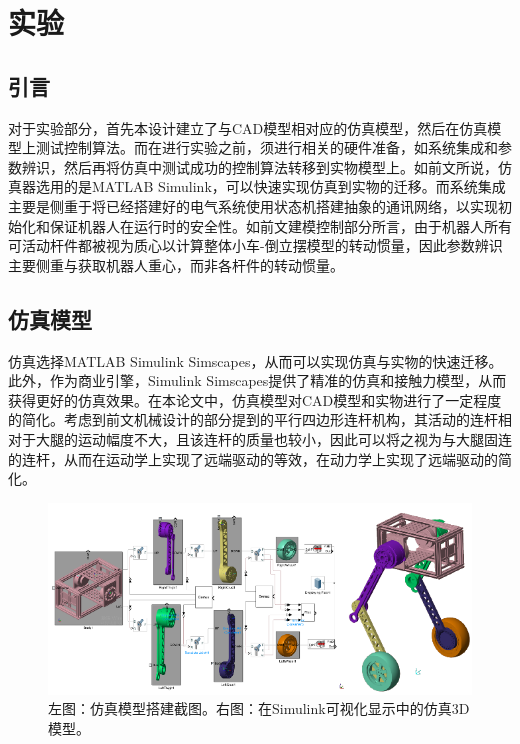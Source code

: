 \section{实验}

\subsection{引言}
对于实验部分，首先本设计建立了与CAD模型相对应的仿真模型，然后在仿真模型上测试控制算法。而在进行实验之前，须进行相关的硬件准备，如系统集成和参数辨识，然后再将仿真中测试成功的控制算法转移到实物模型上。如前文所说，仿真器选用的是MATLAB Simulink，可以快速实现仿真到实物的迁移。而系统集成主要是侧重于将已经搭建好的电气系统使用状态机搭建抽象的通讯网络，以实现初始化和保证机器人在运行时的安全性。如前文建模控制部分所言，由于机器人所有可活动杆件都被视为质心以计算整体小车-倒立摆模型的转动惯量，因此参数辨识主要侧重与获取机器人重心，而非各杆件的转动惯量。

\subsection{仿真模型}
仿真选择MATLAB Simulink Simscapes，从而可以实现仿真与实物的快速迁移。此外，作为商业引擎，Simulink Simscapes提供了精准的仿真和接触力模型，从而获得更好的仿真效果。在本论文中，仿真模型对CAD模型和实物进行了一定程度的简化。考虑到前文机械设计的部分提到的平行四边形连杆机构，其活动的连杆相对于大腿的运动幅度不大，且该连杆的质量也较小，因此可以将之视为与大腿固连的连杆，从而在运动学上实现了远端驱动的等效，在动力学上实现了远端驱动的简化。

\begin{figure}[h!]
  \centering
  \includegraphics[width=1.0\linewidth]{figures/Sec5/simumod.png}
  \caption{
  左图：仿真模型搭建截图。右图：在Simulink可视化显示中的仿真3D模型。
  }
  \label{fig:sec5-simumod}
   \vspace{6pt}
\end{figure}


